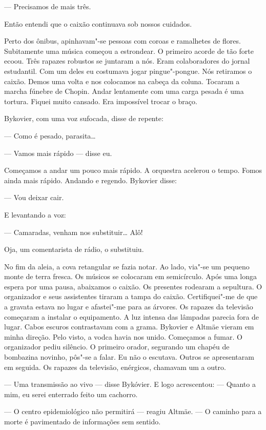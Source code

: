 --- Precisamos de mais três.

Então entendi que o caixão continuava sob nossos cuidados.

Perto dos ônibus, apinhavam"-se pessoas com coroas e ramalhetes de
flores. Subitamente uma música começou a estrondear. O primeiro acorde
de tão forte ecoou. Três rapazes robustos se juntaram a nós. Eram
colaboradores do jornal estudantil. Com um deles eu costumava jogar
pingue"-pongue. Nós retiramos o caixão. Demos uma volta e nos colocamos
na cabeça da coluna. Tocaram a marcha fúnebre de Chopin. Andar
lentamente com uma carga pesada é uma tortura. Fiquei muito cansado. Era
impossível trocar o braço.

Bykovier, com uma voz sufocada, disse de repente:

--- Como é pesado, parasita\ldots{}

--- Vamos mais rápido --- disse eu.

Começamos a andar um pouco mais rápido. A orquestra acelerou o tempo.
Fomos ainda mais rápido. Andando e regendo. Bykovier disse:

--- Vou deixar cair.

E levantando a voz:

--- Camaradas, venham nos substituir\ldots{} Alô!

Oja, um comentarista de rádio, o substituiu.

No fim da aleia, a cova retangular se fazia notar. Ao lado, via"-se um
pequeno monte de terra fresca. Os músicos se colocaram em semicírculo.
Após uma longa espera por uma pausa, abaixamos o caixão. Os presentes
rodearam a sepultura. O organizador e seus assistentes tiraram a tampa
do caixão. Certifiquei"-me de que a gravata estava no lugar e afastei"-me
para as árvores. Os rapazes da televisão começaram a instalar o
equipamento. A luz intensa das lâmpadas parecia fora de lugar. Cabos
escuros contrastavam com a grama. Bykovier e Altmäe vieram em minha
direção. Pelo visto, a vodca havia nos unido. Começamos a fumar. O
organizador pediu silêncio. O primeiro orador, segurando um chapéu de
bombazina novinho, pôs"-se a falar. Eu não o escutava. Outros se
apresentaram em seguida. Os rapazes da televisão, enérgicos, chamavam um
a outro.

--- Uma transmissão ao vivo --- disse Bykóvier. E logo acrescentou: ---
Quanto a mim, eu serei enterrado feito um cachorro.

--- O centro epidemiológico não permitirá --- reagiu Altmäe. --- O
caminho para a morte é pavimentado de informações sem sentido.

